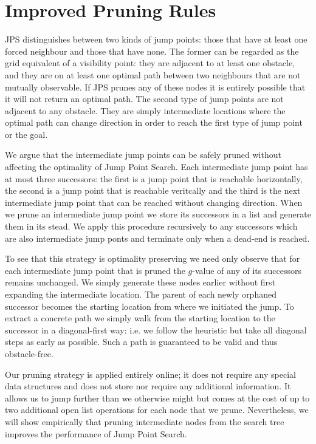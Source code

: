 \section{Improved Pruning Rules}
\label{sec::pruning}
JPS distinguishes between two kinds of jump points: those that have at least
one forced neighbour and those that have none. The former can be regarded as
the grid equivalent of a visibility point: they are adjacent to at least one
obstacle, and they are on at least one optimal path between two neighbours
that are not mutually observable. If JPS prunes any of these nodes it is
entirely possible that it will not return an optimal path.  The second type of
jump points are not adjacent to any obstacle. They are simply intermediate
locations where the optimal path can change direction in order to reach the
first type of jump point or the goal.
\par
We argue that the intermediate jump points can be safely pruned without
affecting the optimality of Jump Point Search.  
Each intermediate jump point has at most three successors: the first is a jump 
point that is reachable horizontally, the second is a jump point that is reachable 
veritcally and the third is the next intermediate jump point that can be reached 
without changing direction.
When we prune an intermediate jump point we store its successors in a list and
generate them in its stead. We apply this procedure recursively to any
successors which are also intermediate jump ponts and terminate only when a
dead-end is reached.  

To see that this strategy is optimality preserving we need only observe that
for each intermediate jump point that is pruned the $g$-value of any of its
successors remains unchanged. We simply generate these nodes earlier without
first expanding the intermediate location.  The parent of each newly orphaned
successor becomes the starting location from where we initiated the jump. To
extract a concrete path we simply walk from the starting location to the
successor in a diagonal-first way: i.e. we follow the heuristic but take all
diagonal steps as early as possible. Such a path is guaranteed to be valid and
thus obstacle-free.

Our pruning strategy is applied entirely online; it does not require any
special data structures and does not store nor require any additional
information.  It allows us to jump further than we otherwise might but comes
at the cost of up to two additional open list operations for each node that we
prune. Nevertheless, we will show empirically that pruning intermediate nodes
from the search tree improves the performance of Jump Point Search.

